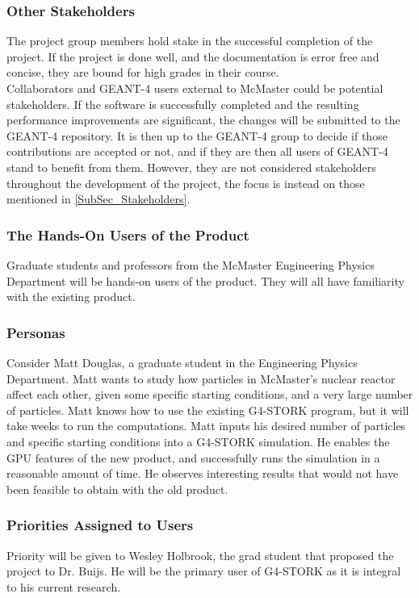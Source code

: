 \documentclass[12pt]{article}
\begin{document}
\subsubsection{Other Stakeholders}
The project group members hold stake in the successful completion of the project. If the project is done well, and the documentation is error free and concise, they are bound for high grades in their course.\\

Collaborators and GEANT-4 users external to McMaster could be potential stakeholders. If the software is successfully completed and the resulting performance improvements are significant, the changes will be submitted to the GEANT-4 repository. It is then up to the GEANT-4 group to decide if those contributions are accepted or not, and if they are then all users of GEANT-4 stand to benefit from them. However, they are not considered stakeholders throughout the development of the project, the focus is instead on those mentioned in \ref{SubSec_Stakeholders}.

\subsubsection{The Hands-On Users of the Product}
Graduate students and professors from the McMaster Engineering Physics Department will be hands-on users of the product. They will all have familiarity with the existing product. 

\subsubsection{Personas}
Consider Matt Douglas, a graduate student in the Engineering Physics Department. Matt wants to study how particles in McMaster's nuclear reactor affect each other, given some specific starting conditions, and a very large number of particles. Matt knows how to use the existing G4-STORK program, but it will take weeks to run the computations. Matt inputs his desired number of particles and specific starting conditions into a G4-STORK simulation. He enables the GPU features of the new product, and successfully runs the simulation in a reasonable amount of time. He observes interesting results that would not have been feasible to obtain with the old product.\\

\subsubsection{Priorities Assigned to Users}
Priority will be given to Wesley Holbrook, the grad student that proposed the project to Dr. Buijs. He will be the primary user of G4-STORK as it is integral to his current research.
\end{document}
